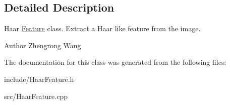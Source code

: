 \subsection{Detailed Description}
Haar \hyperlink{classFeature}{Feature} class. Extract a Haar like feature from the image. \begin{DoxyAuthor}{Author}
Zhengrong Wang 
\end{DoxyAuthor}


The documentation for this class was generated from the following files\+:\begin{DoxyCompactItemize}
\item 
include/Haar\+Feature.\+h\item 
src/Haar\+Feature.\+cpp\end{DoxyCompactItemize}
